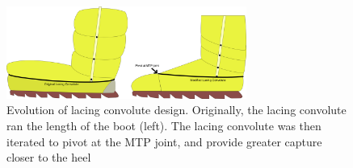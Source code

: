 \documentclass[defaultstyle,11pt]{comps}
\providecommand{\DIFaddtex}[1]{{\protect\color{blue}\uwave{#1}}} %
\providecommand{\DIFdelbegin}{} %
\providecommand{\DIFdelend}{} %
\providecommand{\DIFadd}[1]{\texorpdfstring{\DIFaddtex{#1}}{#1}} %
\newcommand{\DIFscaledelfig}{0.5}
\newlength{\DIFdelgraphicswidth} %
\newlength{\DIFdelgraphicsheight} %
\newcommand{\DIFdelincludegraphics}[2][]{%
\sbox{\DIFdelgraphicsbox}{\DIFOincludegraphics[#1]{#2}}%
\settoboxwidth{\DIFdelgraphicswidth}{\DIFdelgraphicsbox} %
\settoboxtotalheight{\DIFdelgraphicsheight}{\DIFdelgraphicsbox} %
\scalebox{\DIFscaledelfig}{%
\parbox[b]{\DIFdelgraphicswidth}{\usebox{\DIFdelgraphicsbox}\\[-\baselineskip] \rule{\DIFdelgraphicswidth}{0em}}\llap{\resizebox{\DIFdelgraphicswidth}{\DIFdelgraphicsheight}{%
\setlength{\unitlength}{\DIFdelgraphicswidth}%
\begin{picture}(1,1)%
\thicklines\linethickness{2pt} %
{\color[rgb]{1,0,0}\put(0,0){\framebox(1,1){}}}%
{\color[rgb]{1,0,0}\put(0,0){\line( 1,1){1}}}%
{\color[rgb]{1,0,0}\put(0,1){\line(1,-1){1}}}%
\end{picture}%
}\hspace*{3pt}}} %
} %
\DeclareRobustCommand{\DIFdelbegin}{\DIFOdelbegin \let\includegraphics\DIFdelincludegraphics} %
\DeclareRobustCommand{\DIFdelend}{\DIFOaddend \let\includegraphics\DIFOincludegraphics} %
\begin{document}
\DIFdelbegin %

\DIFdelend \begin{figure}
\hypertarget{fig:SA3-lacingevo}{%
\centering
\includegraphics[width=0.7\textwidth,height=\textheight]{../fig/SA3/LacingConvolute_evolution.png}
\caption{Evolution of lacing convolute design. Originally, the lacing convolute ran the length of the boot (left). The lacing convolute was then iterated to pivot at the MTP joint, and provide greater capture closer to the heel}\label{fig:SA3-lacingevo}
}
\end{figure}
\end{document}
